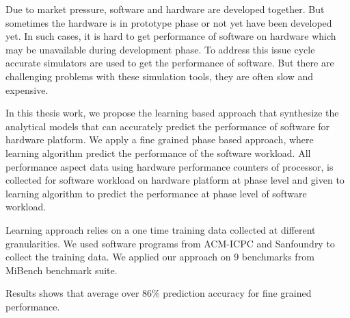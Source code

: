 \setlength{\parindent}{4em}
\setlength{\parskip}{1em}

Due to market pressure, software and hardware are developed together. But sometimes the hardware is in prototype phase or not yet have been developed yet. In such cases, it is hard to get performance of software on hardware which may be unavailable during development phase. To address this issue cycle accurate simulators are used to get the performance of software. But there are challenging problems with these simulation tools, they are often slow and expensive. 

\par In this thesis work, we propose the learning based approach that synthesize the analytical models that can accurately predict the performance of software for hardware platform.  We apply a fine grained phase based approach, where learning algorithm predict the performance of the software workload. All performance aspect data using hardware performance counters of processor, is collected for software workload on hardware platform at phase level and given to learning algorithm to predict the performance at phase level of software workload.

\par Learning approach relies on a one time training data collected at different granularities. We used software programs from ACM-ICPC and Sanfoundry to collect the training data. We applied our approach on 9 benchmarks from MiBench benchmark suite. 

\par Results shows that average over 86\%  prediction accuracy for fine grained performance. 